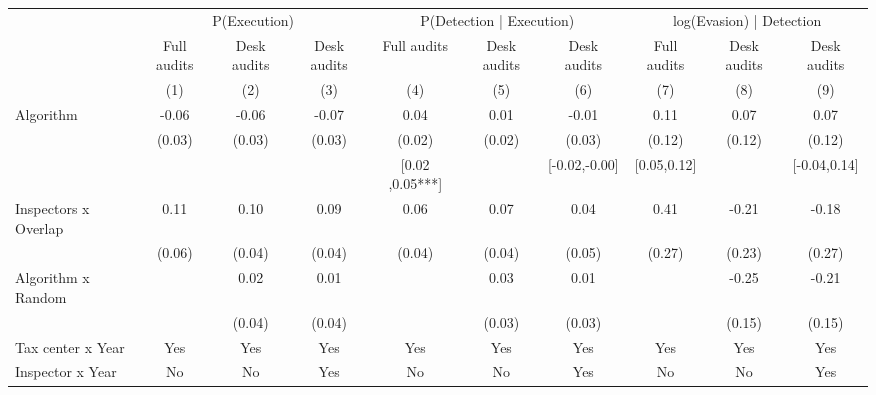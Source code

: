 \begin{tabular}{lccc|ccc|ccc} \toprule
\multicolumn{1}{l}{} & \multicolumn{3}{c}{P(Execution)} & \multicolumn{3}{c}{P(Detection | Execution)} & \multicolumn{3}{c}{log(Evasion) | Detection} \\\cmidrule(lr){2-4}\cmidrule(lr){5-7}\cmidrule(lr){8-10} \multicolumn{1}{l}{} & Full audits & Desk audits & Desk audits & Full audits & Desk audits & Desk audits & Full audits & Desk audits & Desk audits \\ \multicolumn{1}{l}{} & (1) & (2) & (3) & (4) & (5) & (6) & (7) & (8) & (9) \\ \midrule
Algorithm   &       -0.06\sym{*}  &       -0.06\sym{**} &       -0.07\sym{**} &        0.04\sym{**} &        0.01         &       -0.01         &        0.11         &        0.07         &        0.07         \\
            &      (0.03)         &      (0.03)         &      (0.03)         &      (0.02)         &      (0.02)         &      (0.03)         &      (0.12)         &      (0.12)         &      (0.12)         \\
\addlinespace
 & & & & [0.02 ,0.05***] & & [-0.02,-0.00] & [0.05,0.12] & & [-0.04,0.14] \\  Inspectors x Overlap&        0.11\sym{*}  &        0.10\sym{**} &        0.09\sym{**} &        0.06         &        0.07\sym{*}  &        0.04         &        0.41         &       -0.21         &       -0.18         \\
            &      (0.06)         &      (0.04)         &      (0.04)         &      (0.04)         &      (0.04)         &      (0.05)         &      (0.27)         &      (0.23)         &      (0.27)         \\
\addlinespace
Algorithm x Random&                     &        0.02         &        0.01         &                     &        0.03         &        0.01         &                     &       -0.25\sym{*}  &       -0.21         \\
            &                     &      (0.04)         &      (0.04)         &                     &      (0.03)         &      (0.03)         &                     &      (0.15)         &      (0.15)         \\
\midrule
Tax center x Year&         Yes         &         Yes         &         Yes         &         Yes         &         Yes         &         Yes         &         Yes         &         Yes         &         Yes         \\
Inspector x Year&          No         &          No         &         Yes         &          No         &          No         &         Yes         &          No         &          No         &         Yes         \\

\end{tabular}

